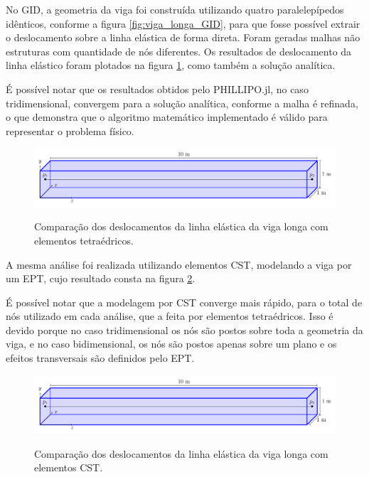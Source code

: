 No GID, a geometria da viga foi construída utilizando quatro paralelepípedos idênticos, conforme a figura \ref{fig:viga_longa_GID}, para que fosse possível extrair o deslocamento sobre a linha elástica de forma direta. Foram geradas malhas não estruturas com quantidade de nós diferentes. Os resultados de deslocamento da linha elástico foram plotados na figura \ref{fig:viga_longa_grafico_tetra}, como também a solução analítica.

É possível notar que os resultados obtidos pelo PHILLIPO.jl, no caso tridimensional, convergem para a solução analítica, conforme a malha é refinada, o que demonstra que o algoritmo matemático implementado é válido para representar o problema físico.

\begin{figure}
    \centering  
    \caption{Comparação dos deslocamentos da linha elástica da viga longa com elementos tetraédricos.}
    \includegraphics[page=3, width=\textwidth]{Figuras/viga_longa.pdf}
    \label{fig:viga_longa_grafico_tetra}
\end{figure}

A mesma análise foi realizada utilizando elementos CST, modelando a viga por um EPT, cujo resultado consta na figura \ref{fig:viga_longa_grafico_CST}. 

É possível notar que a modelagem por CST converge mais rápido, para o total de nós utilizado em cada análise, que a feita por elementos tetraédricos. Isso é devido porque no caso tridimensional os nós são postos sobre toda a geometria da viga, e no caso bidimensional, os nós são postos apenas sobre um plano e os efeitos transversais são definidos pelo EPT.

\begin{figure}
    \centering  
    \caption{Comparação dos deslocamentos da linha elástica da viga longa com elementos CST.}
    \includegraphics[page=5, width=\textwidth]{Figuras/viga_longa.pdf}
    \label{fig:viga_longa_grafico_CST}
\end{figure}